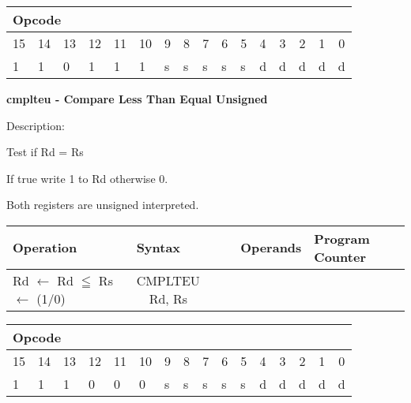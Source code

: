 \documentclass{article}
\begin{document}
\begin{tabular}{|c|c|c|c|c|c|c|c|c|c|c|c|c|c|c|c|}
\hline
\multicolumn{6}{|l|}{Opcode} & \multicolumn{5}{|l|}{} & \multicolumn{5}{|l|}{
} \\ \hline
15 & 14 & 13 & 12 & 11 & 10 & 9 & 8 & 7 & 6 & 5 & 4 & 3 & 2 & 1 & 0 \\ \hline
\multicolumn{1}{|l|}{1} & \multicolumn{1}{|l|}{1} & \multicolumn{1}{|l|}{0}
& \multicolumn{1}{|l|}{1} & \multicolumn{1}{|l|}{1} & \multicolumn{1}{|l|}{1}
& \multicolumn{1}{|l|}{s} & \multicolumn{1}{|l|}{s} & \multicolumn{1}{|l|}{s}
& \multicolumn{1}{|l|}{s} & \multicolumn{1}{|l|}{s} & \multicolumn{1}{|l|}{d}
& \multicolumn{1}{|l|}{d} & \multicolumn{1}{|l|}{d} & \multicolumn{1}{|l|}{d}
& \multicolumn{1}{|l|}{d} \\ \hline
\end{tabular}

\bigskip

\textbf{cmplteu - Compare Less Than Equal Unsigned}

Description:

Test if Rd \TEXTsymbol{<}= Rs

If true write 1 to Rd otherwise 0.

Both registers are unsigned interpreted.

\begin{tabular}{|l|l|l|l|}
\hline
Operation & Syntax & Operands & Program Counter \\ \hline
Rd $\leftarrow $ Rd $\leqq $ Rs $\leftarrow $ (1/0) & CMPLTEU \ \ Rd, Rs & 
&  \\ \hline
\end{tabular}

\begin{tabular}{|c|c|c|c|c|c|c|c|c|c|c|c|c|c|c|c|}
\hline
\multicolumn{6}{|l|}{Opcode} & \multicolumn{5}{|l|}{} & \multicolumn{5}{|l|}{
} \\ \hline
15 & 14 & 13 & 12 & 11 & 10 & 9 & 8 & 7 & 6 & 5 & 4 & 3 & 2 & 1 & 0 \\ \hline
\multicolumn{1}{|l|}{1} & \multicolumn{1}{|l|}{1} & \multicolumn{1}{|l|}{1}
& \multicolumn{1}{|l|}{0} & \multicolumn{1}{|l|}{0} & \multicolumn{1}{|l|}{0}
& \multicolumn{1}{|l|}{s} & \multicolumn{1}{|l|}{s} & \multicolumn{1}{|l|}{s}
& \multicolumn{1}{|l|}{s} & \multicolumn{1}{|l|}{s} & \multicolumn{1}{|l|}{d}
& \multicolumn{1}{|l|}{d} & \multicolumn{1}{|l|}{d} & \multicolumn{1}{|l|}{d}
& \multicolumn{1}{|l|}{d} \\ \hline
\end{tabular}
\end{document}
